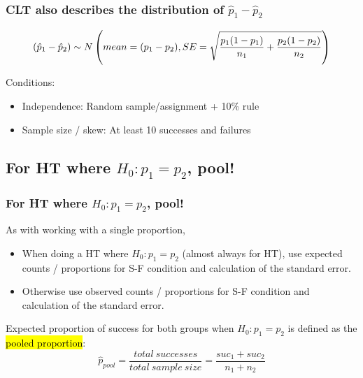 \documentclass[11pt,containsverbatim,handout,xcolor=xelatex,dvipsnames,table]{beamer}
\begin{document}

\begin{frame}
\frametitle{CLT also describes the distribution of $\hat{p}_1 - \hat{p}_2$}

\[ (\hat{p}_1 - \hat{p}_2) \sim N \left(  mean = (p_1 - p_2), SE = \sqrt{ \frac{p_1(1-p_1)}{n_1} + \frac{p_2(1-p_2)}{n_2} }  \right) \]

Conditions:
\begin{itemize}
\item Independence: Random sample/assignment + 10\% rule
\item Sample size / skew: At least 10 successes and failures
\end{itemize}

\end{frame}


\subsection{For HT where $H_0: p_1 = p_2$, pool!}
\label{mi2}


\begin{frame}
\frametitle{For HT where $H_0: p_1 = p_2$, pool!}

As with working with a single proportion,

\begin{itemize}

\item When doing a HT where $H_0: p_1 = p_2$ (almost always for HT), use expected counts / proportions for S-F condition and calculation of the standard error.

\item Otherwise use observed counts / proportions for S-F condition and calculation of the standard error.

\end{itemize}

\pause 

Expected proportion of success for both groups when $H_0: p_1 = p_2$ is defined as the \hl{pooled proportion}:
\[ \hat{p}_{pool} = \frac{total~successes}{total~sample~size} = \frac{suc_1 + suc_2}{n_1 + n_2} \]

\end{frame}

\end{document}
